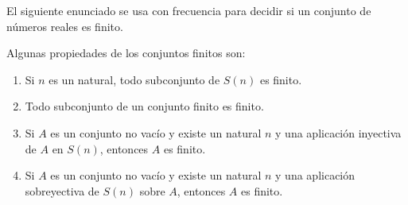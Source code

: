 El siguiente enunciado se usa con frecuencia para decidir si un conjunto de números reales es finito.
\begin{prop}\label{prop:2.3.6} Algunas propiedades de los conjuntos finitos son:
    \begin{enumerate}
        \item\label{prop:2.3.6_1} Si $n$ es un natural, todo subconjunto de $S(n)$ es finito.

        \item Todo subconjunto de un conjunto finito es finito.

        \item Si $A$ es un conjunto no vacío y existe un natural $n$ y una aplicación inyectiva de $A$ en $S(n)$, entonces $A$ es finito.

        \item Si $A$ es un conjunto no vacío y existe un natural $n$ y una aplicación sobreyectiva de $S(n)$ sobre $A$, entonces $A$ es finito.
    \end{enumerate}
\end{prop}
